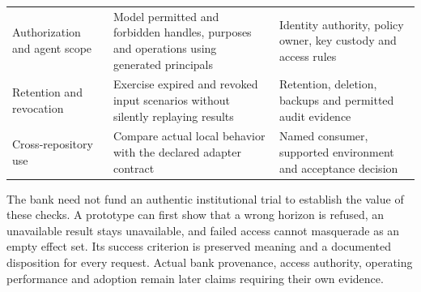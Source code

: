 \begin{longtable}[]{@{}lll@{}}
\begin{minipage}[t]{0.30\columnwidth}
Authorization and agent scope\strut
\end{minipage} & \begin{minipage}[t]{0.30\columnwidth}\raggedright
Model permitted and forbidden handles, purposes and operations using
generated principals\strut
\end{minipage} & \begin{minipage}[t]{0.30\columnwidth}\raggedright
Identity authority, policy owner, key custody and access rules\strut
\end{minipage}\tabularnewline
\begin{minipage}[t]{0.30\columnwidth}\raggedright
Retention and revocation\strut
\end{minipage} & \begin{minipage}[t]{0.30\columnwidth}\raggedright
Exercise expired and revoked input scenarios without silently replaying
results\strut
\end{minipage} & \begin{minipage}[t]{0.30\columnwidth}\raggedright
Retention, deletion, backups and permitted audit evidence\strut
\end{minipage}\tabularnewline
\begin{minipage}[t]{0.30\columnwidth}\raggedright
Cross-repository use\strut
\end{minipage} & \begin{minipage}[t]{0.30\columnwidth}\raggedright
Compare actual local behavior with the declared adapter contract\strut
\end{minipage} & \begin{minipage}[t]{0.30\columnwidth}\raggedright
Named consumer, supported environment and acceptance decision\strut
\end{minipage}\tabularnewline
\bottomrule
\end{longtable}

The bank need not fund an authentic institutional trial to establish the
value of these checks. A prototype can first show that a wrong horizon
is refused, an unavailable result stays unavailable, and failed access
cannot masquerade as an empty effect set. Its success criterion is
preserved meaning and a documented disposition for every request. Actual
bank provenance, access authority, operating performance and adoption
remain later claims requiring their own
evidence.~\citep{exec14_custody_design}

\label{exec14:artifact-custody-end}


